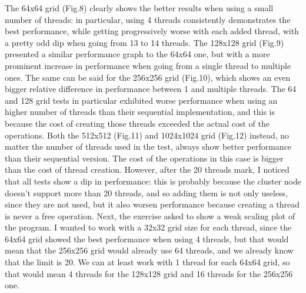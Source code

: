 \documentclass[unicode,11pt,a4paper,oneside,numbers=endperiod,openany]{scrartcl}
\begin{document}
The 64x64 grid (Fig.8) clearly shows the better results when using a small number of threads: 
\newline
in particular, using 4 threads consistently demonstrates the best performance, while getting progressively worse with each added thread, with a pretty odd dip when going from 13 to 14 threads.
\newline
\newline
The 128x128 grid (Fig.9) presented a similar performance graph to the 64x64 one, but with a more prominent increase in performance when going from a single thread to multiple ones.
\newline
\newline
The same can be said for the 256x256 grid (Fig.10), which shows an even bigger relative difference in performance between 1 and multiple threads.
\newline
\newline
The 64 and 128 grid tests in particular exhibited worse performance when using an higher number of threads than their sequential implementation, and this is because the cost of creating those threads exceeded the actual cost of the operations.
\newline
\newline
Both the 512x512 (Fig.11) and 1024x1024 grid (Fig.12) instead, no matter the number of threads used in the test, always show better performance than their sequential version. The cost of the operations in this case is bigger than the cost of thread creation. 
\newline
However, after the 20 threads mark, I noticed that all tests show a dip in performance: this is probably because the cluster node doesn't support more than 20 threads, and so adding them is not only useless, since they are not used, but it also worsen performance because creating a thread is never a free operation.
\newline
\newline
Next, the exercise asked to show a weak scaling plot of the program.
\newline
I wanted to work with a 32x32 grid size for each thread, since the 64x64 grid showed the best performance when using 4 threads, but that would mean that the 256x256 grid would already use 64 threads, and we already know that the limit is 20.
\newline
We can at least work with 1 thread for each 64x64 grid, so that would mean 4 threads for the 128x128 grid and 16 threads for the 256x256 one.
\newline
\end{document}
